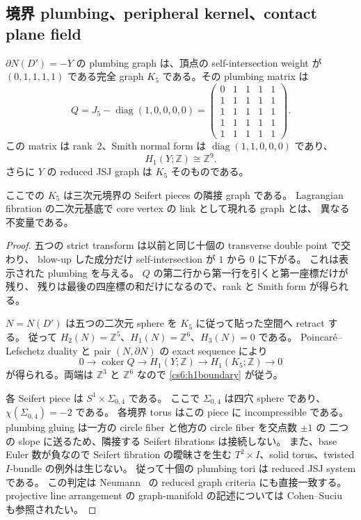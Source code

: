 \subsection{境界 plumbing、peripheral kernel、contact plane field}

\begin{proposition}[固定すべき境界]
\label{cs6:boundary}
$\partial N(D')=-Y$ の plumbing graph は、頂点の self-intersection weight が
$(0,1,1,1,1)$ である完全 graph $K_5$ である。その plumbing matrix は
\[
 Q=J_5-\operatorname{diag}(1,0,0,0,0)
 =\begin{pmatrix}
 0&1&1&1&1\\
 1&1&1&1&1\\
 1&1&1&1&1\\
 1&1&1&1&1\\
 1&1&1&1&1
 \end{pmatrix}.
\]
この matrix は rank~$2$、Smith normal form は
$\operatorname{diag}(1,1,0,0,0)$ であり、
\begin{equation}
 H_1(Y;\mathbb Z)\cong\mathbb Z^9.
 \label{cs6:h1boundary}
\end{equation}
さらに $Y$ の reduced JSJ graph は $K_5$ そのものである。
\end{proposition}

ここでの $K_5$ は三次元境界の Seifert pieces の隣接 graph である。
Lagrangian fibration の二次元基底で core vertex の link として現れる graph とは、
異なる不変量である。

\begin{proof}
五つの strict transform は以前と同じ十個の transverse double point で交わり、
blow-up した成分だけ self-intersection が $1$ から $0$ に下がる。
これは表示された plumbing を与える。
$Q$ の第二行から第一行を引くと第一座標だけが残り、
残りは最後の四座標の和だけになるので、rank と Smith form が得られる。

$N=N(D')$ は五つの二次元 sphere を $K_5$ に従って貼った空間へ retract する。
従って $H_2(N)=\mathbb Z^5$、$H_1(N)=\mathbb Z^6$、$H_3(N)=0$ である。
Poincar\'e--Lefschetz duality と pair $(N,\partial N)$ の exact sequence により
\[
 0\longrightarrow\operatorname{coker}Q
 \longrightarrow H_1(Y;\mathbb Z)
 \longrightarrow H_1(K_5;\mathbb Z)\longrightarrow0
\]
が得られる。両端は $\mathbb Z^3$ と $\mathbb Z^6$ なので
\eqref{cs6:h1boundary} が従う。

各 Seifert piece は $S^1\times\Sigma_{0,4}$ である。
ここで $\Sigma_{0,4}$ は四穴 sphere であり、$\chi(\Sigma_{0,4})=-2$ である。
各境界 torus はこの piece に incompressible である。
plumbing gluing は一方の circle fiber と他方の circle fiber を交点数 $\pm1$ の
二つの slope に送るため、隣接する Seifert fibrations は接続しない。
また、base Euler 数が負なので Seifert fibration の曖昧さを生む
$T^2\times I$、solid torus、twisted $I$-bundle の例外は生じない。
従って十個の plumbing tori は reduced JSJ system である。
この判定は Neumann~\cite[\S5, pp.~321--322]{Neumann} の reduced graph criteria
にも直接一致する。projective line arrangement の graph-manifold の記述については
Cohen--Suciu~\cite[\S2.5]{CohenSuciu} も参照されたい。
\end{proof}

